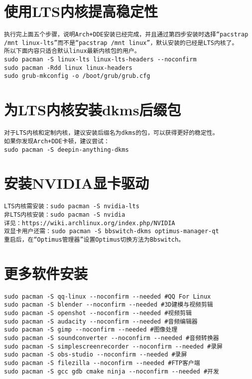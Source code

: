 \documentclass[a4paper,fontset=fandol,zihao=-4,linespread=1.2,oneside]{ctexbook}
\begin{document}
\section{使用LTS内核提高稳定性}
\begin{lstlisting}
执行完上面五个步骤，说明Arch+DDE安装已经完成，并且通过第四步安装时选择“pacstrap /mnt linux-lts”而不是“pacstrap /mnt linux”，默认安装的已经是LTS内核了。
所以下面内容只适合默认linux最新内核包的用户。
sudo pacman -S linux-lts linux-lts-headers --noconfirm
sudo pacman -Rdd linux linux-headers
sudo grub-mkconfig -o /boot/grub/grub.cfg
\end{lstlisting}

\section{为LTS内核安装dkms后缀包}
\begin{lstlisting}
对于LTS内核和定制内核，建议安装后缀名为dkms的包，可以获得更好的稳定性。
如果你发现Arch+DDE卡顿，建议尝试：
sudo pacman -S deepin-anything-dkms
\end{lstlisting}

\section{安装NVIDIA显卡驱动}
\begin{lstlisting}
LTS内核需安装：sudo pacman -S nvidia-lts
非LTS内核安装：sudo pacman -S nvidia
详见：https://wiki.archlinux.org/index.php/NVIDIA
双显卡用户还需：sudo pacman -S bbswitch-dkms optimus-manager-qt
重启后，在“Optimus管理器”设置Optimus切换方法为Bbswitch。
\end{lstlisting}

\section{更多软件安装}
\begin{lstlisting}
sudo pacman -S qq-linux --noconfirm --needed #QQ For Linux
sudo pacman -S blender --noconfirm --needed #3D建模与视频剪辑
sudo pacman -S openshot --noconfirm --needed #视频剪辑
sudo pacman -S audacity --noconfirm --needed #音频编辑器
sudo pacman -S gimp --noconfirm --needed #图像处理
sudo pacman -S soundconverter --noconfirm --needed #音频转换器
sudo pacman -S simplescreenrecorder --noconfirm --needed #录屏
sudo pacman -S obs-studio --noconfirm --needed #录屏
sudo pacman -S filezilla --noconfirm --needed #FTP客户端
sudo pacman -S gcc gdb cmake ninja --noconfirm --needed #开发
\end{lstlisting}
\end{document}
